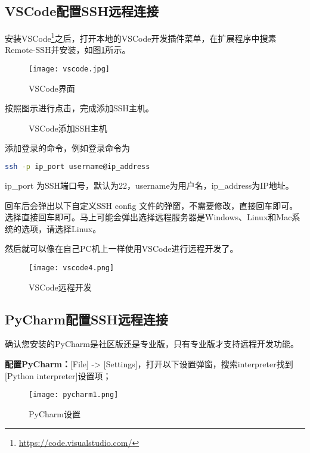 \documentclass[lang=cn,a4paper,newtx]{elegantpaper}
\begin{document}
\newpage
\subsection{VSCode配置SSH远程连接}
安装VSCode\footnote{\url{https://code.visualstudio.com/}}之后，打开本地的VSCode开发插件菜单，在扩展程序中搜素Remote-SSH并安装，如图\ref{fig:vscode}所示。

\begin{figure}[hbpt]
  \centering
  \texttt{[image: vscode.jpg]}
  \caption{VSCode界面}
  \label{fig:vscode}
\end{figure}

按照图示进行点击，完成添加SSH主机。
\begin{figure}[hbpt]
  \centering
  \quad
  \caption{VSCode添加SSH主机}
  \label{fig:vscode2}
\end{figure}

添加登录的命令，例如登录命令为
\begin{lstlisting}[language=bash]
  ssh -p ip_port username@ip_address
\end{lstlisting}

ip\_port 为SSH端口号，默认为22，username为用户名，ip\_address为IP地址。

回车后会弹出以下自定义SSH config 文件的弹窗，不需要修改，直接回车即可。
选择直接回车即可。马上可能会弹出选择远程服务器是Windows、Linux和Mac系统的选项，请选择Linux。

然后就可以像在自己PC机上一样使用VSCode进行远程开发了。
\begin{figure}
  \centering
  \texttt{[image: vscode4.png]}
  \caption{VSCode远程开发}
  \label{fig:vscode4}
\end{figure}

\newpage
\subsection{PyCharm配置SSH远程连接}
确认您安装的PyCharm是社区版还是专业版，只有专业版才支持远程开发功能。

\textbf{配置PyCharm：}[File] -> [Settings]，打开以下设置弹窗，搜索interpreter找到[Python interpreter]设置项；
\begin{figure}[hbpt]
  \centering
  \texttt{[image: pycharm1.png]}
  \caption{PyCharm设置}
  \label{fig:pycharm1}
\end{figure}
\end{document}
